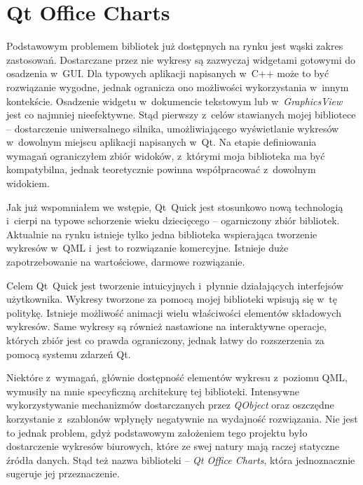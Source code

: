 \section{Qt Office Charts}
Podstawowym problemem bibliotek już dostępnych na rynku jest wąski zakres zastosowań. Dostarczane przez nie wykresy są zazwyczaj widgetami gotowymi do osadzenia w~GUI. Dla typowych aplikacji napisanych w~C++ może to być rozwiązanie wygodne, jednak ogranicza ono możliwości wykorzystania w~innym kontekście. Osadzenie widgetu w~dokumencie tekstowym lub w~\textit{GraphicsView} jest co najmniej nieefektywne. Stąd pierwszy z~celów stawianych mojej bibliotece -- dostarczenie uniwersalnego silnika, umożliwiającego wyświetlanie wykresów w~dowolnym miejscu aplikacji napisanych w~Qt. Na etapie definiowania wymagań ograniczyłem zbiór widoków, z~którymi moja biblioteka ma być kompatybilna, jednak teoretycznie powinna współpracować z~dowolnym widokiem.

Jak już wspomniałem we wstępie, Qt~Quick jest stosunkowo nową technologią i~cierpi na typowe schorzenie wieku dziecięcego -- ogarniczony zbiór bibliotek. Aktualnie na rynku istnieje tylko jedna biblioteka wspierająca tworzenie wykresów w~QML i~jest to rozwiązanie komercyjne. Istnieje duże zapotrzebowanie na wartościowe, darmowe rozwiązanie.

Celem Qt~Quick jest tworzenie intuicyjnych i~płynnie działających interfejsów użytkownika. Wykresy tworzone za pomocą mojej biblioteki wpisują się w~tę politykę. Istnieje możliwość animacji wielu właściwości elementów składowych wykresów. Same wykresy są również nastawione na interaktywne operacje, których zbiór jest co prawda ograniczony, jednak łatwy do rozszerzenia za pomocą systemu zdarzeń Qt.

Niektóre z~wymagań, głównie dostępność elementów wykresu z~poziomu QML, wymusiły na mnie specyficzną architekurę tej biblioteki. Intensywne wykorzystywanie mechanizmów dostarczanych przez \textit{QObject} oraz oszczędne korzystanie z~szablonów wpłynęły negatywnie na wydajność rozwiązania. Nie jest to jednak problem, gdyż podstawowym założeniem tego projektu było dostarczenie wykresów biurowych, które ze swej natury mają raczej statyczne źródła danych. Stąd też nazwa biblioteki -- \textit{Qt Office Charts}, która jednoznacznie sugeruje jej przeznaczenie. 
















